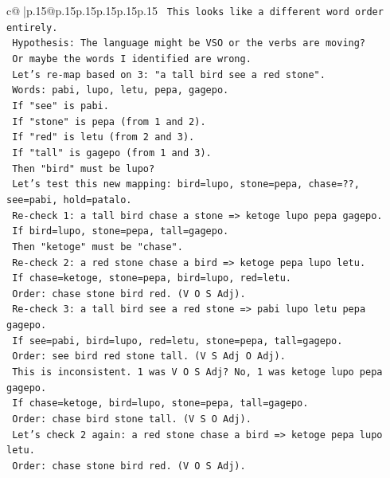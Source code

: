 \documentclass{article}
\begin{document}
{\begin{supertabular}{c@{$\;$}|p{.15\linewidth}@{}p{.15\linewidth}p{.15\linewidth}p{.15\linewidth}p{.15\linewidth}p{.15\linewidth}}
{{{\texttt{   This looks like a different word order entirely.} \\
\texttt{   Hypothesis: The language might be VSO or the verbs are moving?} \\
\texttt{   Or maybe the words I identified are wrong.} \\
\texttt{   Let's re{-}map based on 3: "a tall bird see a red stone".} \\
\texttt{   Words: pabi, lupo, letu, pepa, gagepo.} \\
\texttt{   If "see" is pabi.} \\
\texttt{   If "stone" is pepa (from 1 and 2).} \\
\texttt{   If "red" is letu (from 2 and 3).} \\
\texttt{   If "tall" is gagepo (from 1 and 3).} \\
\texttt{   Then "bird" must be lupo?} \\
\texttt{   Let's test this new mapping: bird=lupo, stone=pepa, chase=??, see=pabi, hold=patalo.} \\
\texttt{   Re{-}check 1: a tall bird chase a stone => ketoge lupo pepa gagepo.} \\
\texttt{   If bird=lupo, stone=pepa, tall=gagepo.} \\
\texttt{   Then "ketoge" must be "chase".} \\
\texttt{   Re{-}check 2: a red stone chase a bird => ketoge pepa lupo letu.} \\
\texttt{   If chase=ketoge, stone=pepa, bird=lupo, red=letu.} \\
\texttt{   Order: chase stone bird red. (V O S Adj).} \\
\texttt{   Re{-}check 3: a tall bird see a red stone => pabi lupo letu pepa gagepo.} \\
\texttt{   If see=pabi, bird=lupo, red=letu, stone=pepa, tall=gagepo.} \\
\texttt{   Order: see bird red stone tall. (V S Adj O Adj).} \\
\texttt{   This is inconsistent. 1 was V O S Adj? No, 1 was ketoge lupo pepa gagepo.} \\
\texttt{   If chase=ketoge, bird=lupo, stone=pepa, tall=gagepo.} \\
\texttt{   Order: chase bird stone tall. (V S O Adj).} \\
\texttt{   Let's check 2 again: a red stone chase a bird => ketoge pepa lupo letu.} \\
\texttt{   Order: chase stone bird red. (V O S Adj).} \\
}}}
\end{supertabular}}
\end{document}
